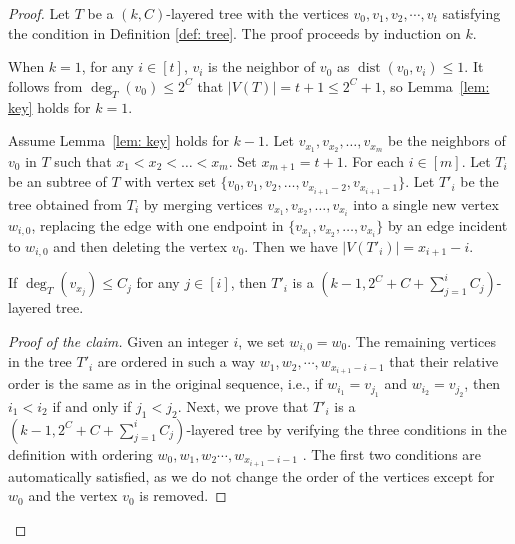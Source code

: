 \documentclass[10pt,a4paper]{amsart}
\newcommand{\dist}{\operatorname{dist}}
\newenvironment{poc}{\begin{proof}[Proof of the claim]\renewcommand*{\qedsymbol}{$\blacksquare$}}{\end{proof}}
\begin{document}
\begin{proof}
    Let $T$ be a $(k,C)$-layered tree with the vertices $v_0,v_1,v_2,\cdots,v_t$ satisfying the condition in Definition \ref{def: tree}.
    The proof proceeds by induction on $k$.
    
    When $k=1$, for any $i\in[t]$, $v_i$ is the neighbor of $v_0$ as $\dist(v_0,v_i) \le 1$. 
    It follows from $\deg_T(v_0) \le 2^C$ that
    $|V(T)| = t+1 \le 2^C+1$, so Lemma~\ref{lem: key} holds for $k=1$.

    Assume Lemma~\ref{lem: key} holds for $k-1$. Let $v_{x_1},v_{x_2}, \dots, v_{x_m}$ be the neighbors of $v_0$ in $T$ such that $x_1 < x_2<\dots < x_m$.
    Set $x_{m+1} = t+1$.
    For each $i\in[m]$.
    Let $T_i$ be an subtree of  $T$ with vertex set $\{v_0,v_1,v_2,\dots, v_{x_{i+1}-2}, v_{x_{i+1}-1}\}$. Let $T'_i$ be the tree obtained from $T_i$ by merging vertices $v_{x_1},v_{x_2}, \dots, v_{x_i}$ into a single new vertex $w_{i,0}$, replacing the edge with one endpoint in $\{v_{x_1},v_{x_2}, \dots, v_{x_i}\}$ by an edge incident to $w_{i,0}$ and then deleting the vertex $v_0$. Then we have $|V(T'_i)| = x_{i+1}-i$.
    \begin{claim}\label{claim: 2.3}
        If $\deg_T(v_{x_j}) \le C_j$ for any $j\in [i]$, then $T'_i$ is a $(k-1,2^C + C + \sum^{i}_{j=1}C_j)$-layered tree.
    \end{claim}
    \begin{poc}
    Given an integer $i$, we set $w_{i,0} = w_0$.
    The remaining vertices in the tree $T'_i$ are ordered in such a way $w_1,w_2,\cdots,w_{x_{i+1}-i-1}$ that their relative order is the same as in the original sequence, i.e., if $w_{i_1} =v_{j_1}$ and $w_{i_2} = v_{j_{2}}$, then $i_1<i_2$ if and only if $j_1<j_2$.
    Next, we prove that $T'_i$ is a $(k-1,2^C + C + \sum^{i}_{j=1}C_j)$-layered tree by verifying the three conditions in the definition with ordering $w_0,w_1,w_2\cdots,w_{x_{i+1}-i-1}$ .
    The first two conditions are automatically satisfied, as we do not change the order of the vertices except for $w_0$ and the vertex $v_0$ is removed. 
    

\end{poc}
\end{proof}
\end{document}
